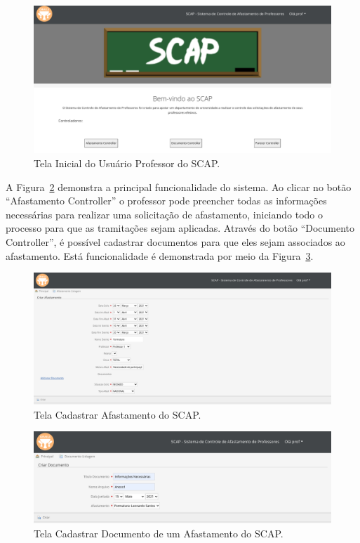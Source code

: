 \begin{figure}[!h]
	\centering
	\includegraphics[scale=0.33]{figuras/fig-projeto-usuario-professor} 
	\caption{Tela Inicial do Usuário Professor do SCAP.}
	\label{fig-projeto-usuario-professor}
\end{figure}

A Figura~\ref{fig-projeto-cadastrar-afastamento} demonstra a principal funcionalidade do sistema. Ao clicar no botão ``Afastamento Controller'' o professor pode preencher todas as informações necessárias para realizar uma solicitação de afastamento, iniciando todo o processo para que as tramitações sejam aplicadas. Através do botão ``Documento Controller'', é possível cadastrar documentos para que eles sejam associados ao afastamento. Está funcionalidade é demonstrada por meio da Figura~\ref{fig-projeto-cadastrar-documento}.   

\begin{figure}[!h]
	\centering
	\includegraphics[scale=0.33]{figuras/fig-projeto-cadastrar-afastamento} 
	\caption{Tela Cadastrar Afastamento do SCAP.}
	\label{fig-projeto-cadastrar-afastamento}
\end{figure}

\begin{figure}[!h]
	\centering
	\includegraphics[scale=0.33]{figuras/fig-projeto-cadastrar-documento} 
	\caption{Tela Cadastrar Documento de um Afastamento do SCAP.}
	\label{fig-projeto-cadastrar-documento}
\end{figure}

